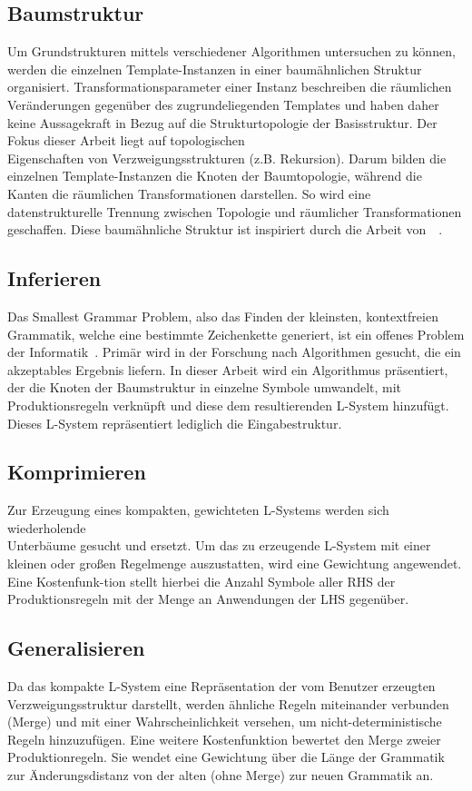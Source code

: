 \subsection*{Baumstruktur}
Um Grundstrukturen mittels verschiedener Algorithmen untersuchen zu können, werden die einzelnen Template-Instanzen in
einer baumähnlichen Struktur organisiert.
Transformationsparameter einer Instanz beschreiben die räumlichen Veränderungen gegenüber des zugrundeliegenden Templates
und haben daher keine Aussagekraft in Bezug auf die Strukturtopologie der Basisstruktur.
Der Fokus dieser Arbeit liegt auf topologischen\\Eigenschaften von Verzweigungsstrukturen (z.B. Rekursion).
Darum bilden die einzelnen Template-Instanzen die Knoten der Baumtopologie, während die Kanten die räumlichen Transformationen
darstellen.
So wird eine datenstrukturelle Trennung zwischen Topologie und räumlicher Transformationen geschaffen.
Diese baumähnliche Struktur ist inspiriert durch die Arbeit von~\citeauthor{guo_2020}~\cite{guo_2020}.

\subsection*{Inferieren}
Das Smallest Grammar Problem, also das Finden der kleinsten, kontextfreien Grammatik, welche eine bestimmte Zeichenkette
generiert, ist ein offenes Problem der Informatik~\cite{charikar_2005}.
Primär wird in der Forschung nach Algorithmen gesucht, die ein akzeptables Ergebnis liefern.
In dieser Arbeit wird ein Algorithmus präsentiert, der die Knoten der Baumstruktur in einzelne Symbole umwandelt, mit
Produktionsregeln verknüpft und diese dem resultierenden L-System hinzufügt.
Dieses L-System repräsentiert lediglich die Eingabestruktur.

\newpage

\subsection*{Komprimieren}
Zur Erzeugung eines kompakten, gewichteten L-Systems werden sich wiederholende\\Unterbäume gesucht und ersetzt.
Um das zu erzeugende L-System mit einer kleinen oder großen Regelmenge auszustatten, wird eine Gewichtung angewendet.
Eine Kostenfunk-tion stellt hierbei die Anzahl Symbole aller RHS der Produktionsregeln mit der Menge an Anwendungen der
LHS gegenüber.

\subsection*{Generalisieren}
Da das kompakte L-System eine Repräsentation der vom Benutzer erzeugten Verzweigungsstruktur darstellt, werden ähnliche
Regeln miteinander verbunden (Merge) und mit einer Wahrscheinlichkeit versehen, um nicht-deterministische Regeln hinzuzufügen.
Eine weitere Kostenfunktion bewertet den Merge zweier Produktionregeln.
Sie wendet eine Gewichtung über die Länge der Grammatik zur Änderungsdistanz von der alten (ohne Merge) zur neuen Grammatik an.

